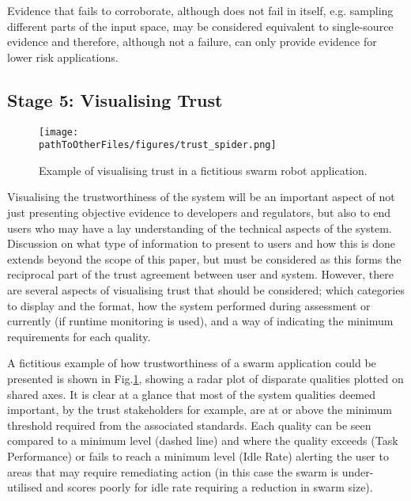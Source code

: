 Evidence that fails to corroborate, although does not fail in itself, e.g. sampling different parts of the input space, may be considered equivalent to single-source evidence and therefore, although not a failure, can only provide evidence for lower risk applications.


\subsection{Stage 5: Visualising Trust}

\begin{figure}[]
    \centering
    \texttt{[image: \\pathToOtherFiles/figures/trust\_spider.png]}
    \caption{Example of visualising trust in a fictitious swarm robot application.}
    \label{fig:spider}
\end{figure}

Visualising the trustworthiness of the system will be an important aspect of not just presenting objective evidence to developers and regulators, but also to end users who may have a lay understanding of the technical aspects of the system. 
%
Discussion on what type of information to present to users and how this is done extends beyond the scope of this paper, but must be considered as this forms the reciprocal part of the trust agreement between user and system. 
%
However, there are several aspects of visualising trust that should be considered; which categories to display and the format, how the system performed during assessment or currently (if runtime monitoring is used), and a way of indicating the minimum requirements for each quality.

A fictitious example of how trustworthiness of a swarm application could be presented is shown in Fig.\ref{fig:spider}, showing a radar plot of disparate qualities plotted on shared axes. It is clear at a glance that most of the system qualities deemed important, by the trust stakeholders for example, are at or above the minimum threshold required from the associated standards.
%
Each quality can be seen compared to a minimum level (dashed line) and where the quality exceeds (Task Performance) or fails to reach a minimum level (Idle Rate) alerting the user to areas that may require remediating action (in this case the swarm is under-utilised and scores poorly for idle rate requiring a reduction in swarm size). 

